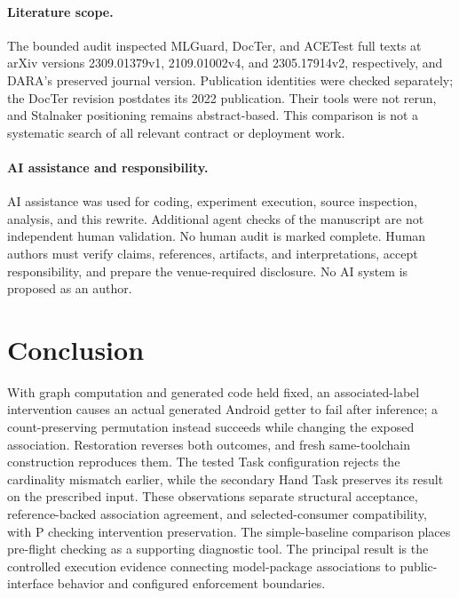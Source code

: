 \documentclass[10pt,twocolumn,letterpaper]{article}
\begin{document}
\paragraph{Literature scope.}
The bounded audit inspected MLGuard, DocTer, and ACETest full texts at arXiv versions 2309.01379v1, 2109.01002v4, and 2305.17914v2, respectively, and DARA's preserved journal version. Publication identities were checked separately; the DocTer revision postdates its 2022 publication. Their tools were not rerun, and Stalnaker positioning remains abstract-based. This comparison is not a systematic search of all relevant contract or deployment work.

\paragraph{AI assistance and responsibility.}
AI assistance was used for coding, experiment execution, source inspection, analysis, and this rewrite. Additional agent checks of the manuscript are not independent human validation. No human audit is marked complete. Human authors must verify claims, references, artifacts, and interpretations, accept responsibility, and prepare the venue-required disclosure. No AI system is proposed as an author.

\section{Conclusion}
With graph computation and generated code held fixed, an associated-label intervention causes an actual generated Android getter to fail after inference; a count-preserving permutation instead succeeds while changing the exposed association. Restoration reverses both outcomes, and fresh same-toolchain construction reproduces them. The tested Task configuration rejects the cardinality mismatch earlier, while the secondary Hand Task preserves its result on the prescribed input. These observations separate structural acceptance, reference-backed association agreement, and selected-consumer compatibility, with P checking intervention preservation. The simple-baseline comparison places pre-flight checking as a supporting diagnostic tool. The principal result is the controlled execution evidence connecting model-package associations to public-interface behavior and configured enforcement boundaries.
\end{document}

